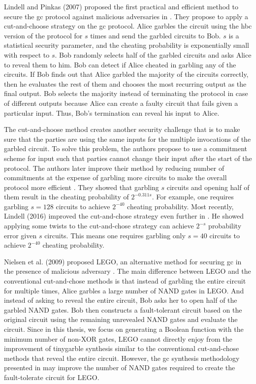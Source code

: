 Lindell and Pinkas (2007) proposed the first practical and efficient method to secure the \acrshort{gc} protocol against malicious adversaries in \cite{lindell2007efficient}.
They propose to apply a cut-and-choose strategy on the \acrshort{gc} protocol.
Alice garbles the circuit using the \acrshort{hbc} version of the protocol for $s$ times and send the garbled circuits to Bob.
$s$ is a statistical security parameter, and the cheating probability is exponentially small with respect to $s$.
Bob randomly selects half of the garbled circuits and asks Alice to reveal them to him.
Bob can detect if Alice cheated in garbling any of the circuits.
If Bob finds out that Alice garbled the majority of the circuits correctly, then he evaluates the rest of them and chooses the most recurring output as the final output.
Bob selects the majority instead of terminating the protocol in case of different outputs because Alice can create a faulty circuit that fails given a particular input.
Thus, Bob's termination can reveal his input to Alice.

The cut-and-choose method creates another security challenge that is to make sure that the parties are using the same inputs for the multiple invocations of the garbled circuit.
To solve this problem, the authors propose to use a commitment scheme for input such that parties cannot change their input after the start of the protocol.
The authors later improve their method by reducing number of commitments at the expense of garbling more circuits to make the overall protocol more efficient \cite{lindell2012secure}.
They showed that garbling $s$ circuits and opening half of them result in the cheating probability of $2^{-0.311s}$.
For example, one requires garbling $s=128$ circuits to achieve $2^{-40}$ cheating probability.
Most recently, Lindell (2016) improved the cut-and-chose strategy even further in \cite{lindell2016fast}.
He showed applying some twists to the cut-and-chose strategy can achieve $2^{-s}$ probability error given $s$ circuits.
This means one requires garbling only $s=40$ circuits to achieve $2^{-40}$ cheating probability.

Nielsen et al. (2009) proposed LEGO, an alternative method for securing \acrshort{gc} in the presence of malicious adversary \cite{nielsen2009lego}.
The main difference between LEGO and the conventional cut-and-chose methods  \cite{lindell2007efficient, shen2011two, lindell2012secure, mohassel2013garbled, lindell2016fast} is that instead of garbling the entire circuit for multiple times, Alice garbles a large number of NAND gates in LEGO.
And instead of asking to reveal the entire circuit, Bob asks her to open half of the garbled NAND gates.
Bob then constructs a fault-tolerant circuit based on the original circuit using the remaining unrevealed NAND gates and evaluate the circuit.
Since in this thesis, we focus on generating a Boolean function with the minimum number of non-XOR gates, LEGO cannot directly enjoy from the improvement of \gls{tinygarble} synthesis similar to the conventional cut-and-chose methods that reveal the entire circuit.
However, the \acrshort{gc} synthesis methodology presented in  may improve the number of NAND gates required to create the fault-tolerate circuit for LEGO.

